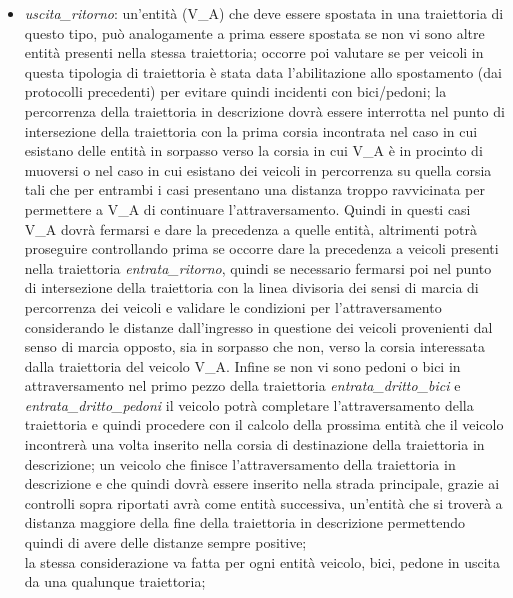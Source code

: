 \begin{enumerate}
\begin{itemize}
\item \textit{usci\-ta\_ri\-tor\-no}: un'entità (V\_A) che deve essere spostata in una traiettoria di questo tipo, può analogamente a prima essere spostata se non vi sono altre entità presenti nella stessa traiettoria; occorre poi valutare se per veicoli in questa tipologia di traiettoria è stata data l'abilitazione allo spostamento (dai protocolli precedenti) per evitare quindi incidenti con bici/pedoni; la percorrenza della traiettoria in descrizione dovrà essere interrotta nel punto di intersezione della traiettoria con la prima corsia incontrata nel caso in cui esistano delle entità in sorpasso verso la corsia in cui V\_A è in procinto di muoversi o nel caso in cui esistano dei veicoli in percorrenza su quella corsia tali che per entrambi i casi presentano una distanza troppo ravvicinata per permettere a V\_A di continuare l'attraversamento. Quindi in questi casi V\_A dovrà fermarsi e dare la precedenza a quelle entità, altrimenti potrà proseguire controllando prima se occorre dare la precedenza a veicoli presenti nella traiettoria \textit{en\-tra\-ta\_ri\-tor\-no}, quindi se necessario fermarsi poi nel punto di intersezione della traiettoria con la linea divisoria dei sensi di marcia di percorrenza dei veicoli e validare le condizioni per l'attraversamento considerando le distanze dall'ingresso in questione dei veicoli provenienti dal senso di marcia opposto, sia in sorpasso che non, verso la corsia interessata dalla traiettoria del veicolo V\_A. Infine se non vi sono pedoni o bici in attraversamento nel primo pezzo della traiettoria \textit{en\-tra\-ta\_drit\-to\_bi\-ci} e \textit{en\-tra\-ta\_drit\-to\_pe\-do\-ni} il veicolo potrà completare l'attraversamento della traiettoria e quindi procedere con il calcolo della prossima entità che il veicolo incontrerà una volta inserito nella corsia di destinazione della traiettoria in descrizione; un veicolo che finisce l'attraversamento della traiettoria in descrizione e che quindi dovrà essere inserito nella strada principale, grazie ai controlli sopra riportati avrà come entità successiva, un'entità che si troverà a distanza maggiore della fine della traiettoria in descrizione permettendo quindi di avere delle distanze sempre positive;\\
la stessa considerazione va fatta per ogni entità veicolo, bici, pedone in uscita da una qualunque traiettoria;

\end{itemize}
\end{enumerate}
